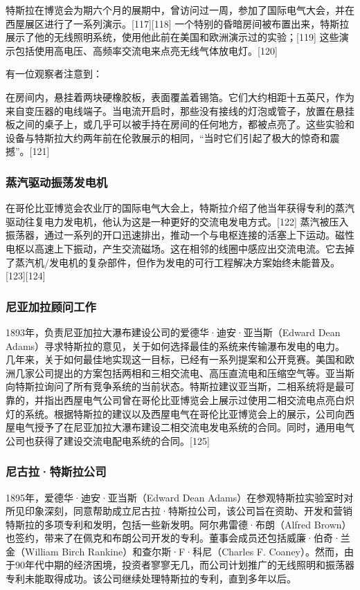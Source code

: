 特斯拉在博览会为期六个月的展期中，曾访问过一周，参加了国际电气大会，并在西屋展区进行了一系列演示。[117][118] 一个特别的昏暗房间被布置出来，特斯拉展示了他的无线照明系统，使用他此前在美国和欧洲演示过的实验；[119] 这些演示包括使用高电压、高频率交流电来点亮无线气体放电灯。[120]

有一位观察者注意到：

在房间内，悬挂着两块硬橡胶板，表面覆盖着锡箔。它们大约相距十五英尺，作为来自变压器的电线端子。当电流开启时，那些没有接线的灯泡或管子，放置在悬挂板之间的桌子上，或几乎可以被手持在房间的任何地方，都被点亮了。这些实验和设备与特斯拉大约两年前在伦敦展示的相同，“当时它们引起了极大的惊奇和震撼”。[121]
\subsubsection{蒸汽驱动振荡发电机}  
在哥伦比亚博览会农业厅的国际电气大会上，特斯拉介绍了他当年获得专利的蒸汽驱动往复电力发电机，他认为这是一种更好的交流电发电方式。[122] 蒸汽被压入振荡器，通过一系列的开口迅速排出，推动一个与电枢连接的活塞上下运动。磁性电枢以高速上下振动，产生交流磁场。这在相邻的线圈中感应出交流电流。它去掉了蒸汽机/发电机的复杂部件，但作为发电的可行工程解决方案始终未能普及。[123][124]
\subsubsection{尼亚加拉顾问工作}  
1893年，负责尼亚加拉大瀑布建设公司的爱德华·迪安·亚当斯（Edward Dean Adams）寻求特斯拉的意见，关于如何选择最佳的系统来传输瀑布发电的电力。几年来，关于如何最佳地实现这一目标，已经有一系列提案和公开竞赛。美国和欧洲几家公司提出的方案包括两相和三相交流电、高压直流电和压缩空气等。亚当斯向特斯拉询问了所有竞争系统的当前状态。特斯拉建议亚当斯，二相系统将是最可靠的，并指出西屋电气公司曾在哥伦比亚博览会上展示过使用二相交流电点亮白炽灯的系统。根据特斯拉的建议以及西屋电气在哥伦比亚博览会上的展示，公司向西屋电气授予了在尼亚加拉大瀑布建设二相交流电发电系统的合同。同时，通用电气公司也获得了建设交流电配电系统的合同。[125]
\subsubsection{尼古拉·特斯拉公司} 
1895年，爱德华·迪安·亚当斯（Edward Dean Adams）在参观特斯拉实验室时对所见印象深刻，同意帮助成立尼古拉·特斯拉公司，该公司旨在资助、开发和营销特斯拉的多项专利和发明，包括一些新发明。阿尔弗雷德·布朗（Alfred Brown）也签约，带来了在佩克和布朗公司开发的专利。董事会成员还包括威廉·伯奇·兰金（William Birch Rankine）和查尔斯·F·科尼（Charles F. Coaney）。然而，由于90年代中期的经济困境，投资者寥寥无几，而公司计划推广的无线照明和振荡器专利未能取得成功。该公司继续处理特斯拉的专利，直到多年以后。
